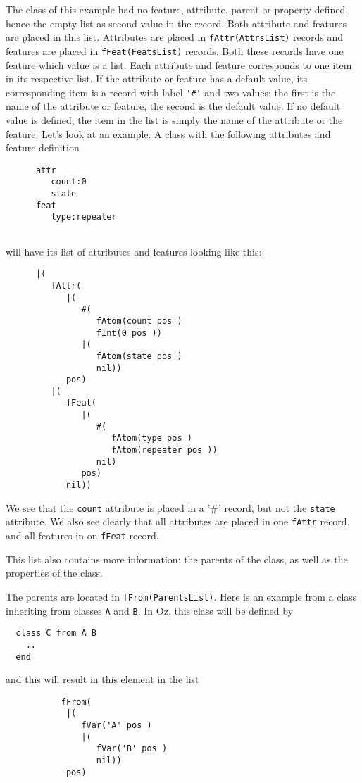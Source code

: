 \documentclass[a4paper]{memoir}
\begin{document}
The class of this example had no feature, attribute, parent or property defined, hence the empty
list as second value in the record.
Both attribute and features are placed in this list. Attributes are placed in
\lstinline!fAttr(AttrsList)! records and features are placed in
\lstinline!fFeat(FeatsList)! records. Both these records have one feature which
value is a list. Each attribute and feature corresponds to one item in its
respective list. If the attribute or feature has a default value, its
corresponding item is a record with label \lstinline!'#'! and two values: the
first is the name of the attribute or feature, the second is the default value.
If no default value is defined, the item in the list is simply the name of the
attribute or the feature.
Let's look at an example. A class with the following attributes and feature
definition
\begin{lstlisting}
      attr
         count:0
         state
      feat
         type:repeater
  
\end{lstlisting}
will have its list of attributes and features looking like this:
\begin{lstlisting}
      |(
         fAttr(
            |(
               #(
                  fAtom(count pos )
                  fInt(0 pos ))
               |(
                  fAtom(state pos )
                  nil))
            pos)
         |(
            fFeat(
               |(
                  #(
                     fAtom(type pos )
                     fAtom(repeater pos ))
                  nil)
               pos)
            nil))
\end{lstlisting}
We see that the \lstinline!count! attribute is placed in a '\#' record, but not
the \lstinline!state! attribute.
We also see clearly that all attributes are placed in one \lstinline!fAttr!
record, and all features in on \lstinline!fFeat! record.

This list also contains more information: the parents of the class, as well as
the properties of the class. 

The parents are located in \lstinline!fFrom(ParentsList)!. 
Here is an example from a class inheriting from classes \lstinline!A! and
\lstinline!B!. In Oz, this class will be defined by
\begin{lstlisting}
  class C from A B
    ..
  end
\end{lstlisting}
and this will result in this element in the list
\begin{lstlisting}
           fFrom(
            |(
               fVar('A' pos )
               |(
                  fVar('B' pos )
                  nil))
            pos)
\end{lstlisting}
\end{document}
